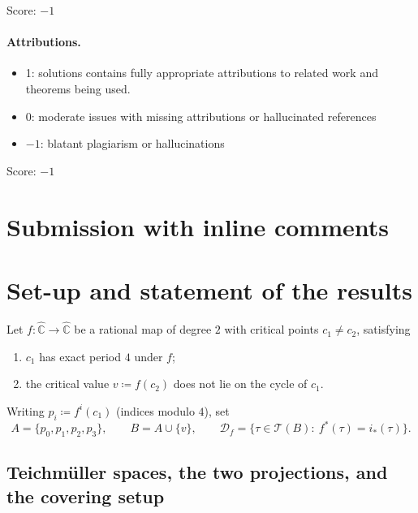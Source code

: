 \documentclass[11pt]{article}
\theoremstyle{definition}
\theoremstyle{remark}
\newcommand{\Teich}{\mathcal T}
\newcommand{\Chat}{\widehat{\mathbb C}}
\newcommand{\Df}{\mathcal D_f}
\begin{document}
\noindent Score: $-1$

\paragraph{Attributions.}
\begin{itemize}
	\item  1: solutions contains fully appropriate attributions
		to related work and theorems being used.
	\item  0: moderate issues with missing attributions or hallucinated references
	\item  $-1$: blatant plagiarism or hallucinations
\end{itemize}

\noindent Score: $-1$

\newpage
\section{Submission with inline comments}


\section{Set-up and statement of the results}\label{sec:setup}

Let $f:\Chat\to\Chat$ be a rational map of degree $2$ with critical
points $c_1\neq c_2$, satisfying
\begin{enumerate}[label=(H\arabic*),leftmargin=3.2em]
\item $c_1$ has exact period $4$ under $f$;
\item the critical value $v\coloneqq f(c_2)$ does not lie on the cycle
of $c_1$.
\end{enumerate}
Writing $p_i\coloneqq f^{i}(c_1)$ (indices modulo $4$), set
\[
A=\{p_0,p_1,p_2,p_3\},\qquad B=A\cup\{v\},\qquad
\Df=\{\tau\in\Teich(B):\ f^*(\tau)=i_*(\tau)\}.
\]

\subsection{Teichm\"uller spaces, the two projections, and the covering
setup}
\end{document}
